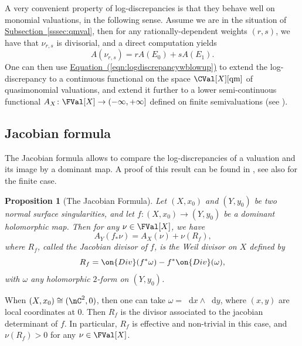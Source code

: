 \documentclass[11 pt, twoside, a4paper]{amsart}
\newcommand{\dd}{\mathop{}\!\mathrm{d}}
\newcommand{\Kld}{{A}}
\newtheorem{prop}[thm]{Proposition}
\theoremstyle{definition}
\theoremstyle{definition}
\newcommand{\JD}[1]{R_{#1}}
\newcommand{\refsssec}[1]{\hyperref[sssec:#1]{Subsection~\ref*{sssec:#1}}}
\newcommand{\refeqn}[1]{\hyperref[eqn:#1]{Equation~(\ref*{eqn:#1})}}
\begin{document}
A very convenient property of log-discrepancies is that they behave well on monomial valuations, in the following sense.
Assume we are in the situation of \refsssec{qmval}, then for any rationally-dependent weights $(r,s)$, we have that $\nu_{r,s}$ is divisorial, and a direct computation yields
\begin{equation}\label{eqn:logdiscrepancywblowup}
\Kld(\nu_{r,s}) = r \Kld(E_0) + s \Kld(E_1)\text{.}
\end{equation}
One can then use \refeqn{logdiscrepancywblowup} to extend the log-discrepancy to a continuous functional on the space $\CVal[X][\mathrm{qm}]$ of quasimonomial valuations, and extend it further to a lower semi-continuous functional $\Kld_X \colon \FVal[X] \to (-\infty,+\infty]$ defined on finite semivaluations (see \cite[Proposition 1.6]{favre:holoselfmapssingratsurf}). 


\subsection{Jacobian formula}\label{ssec:jacobianformula}

The Jacobian formula allows to compare the log-discrepancies of a valuation and its image by a dominant map.
A proof of this result can be found in \cite[Section 4.5]{gignac-ruggiero:locdynnoninvnormsurfsing}, see also \cite[Proposition 1.9]{favre:holoselfmapssingratsurf} for the finite case.

\begin{prop}[The Jacobian Formula]\label{prop:jacobian_formula}
Let $(X,x_0)$ and $(Y,y_0)$ be two normal surface singularities, and let $f\colon(X,x_0) \to (Y,y_0)$ be a dominant holomorphic map.
Then for any $\nu \in \FVal[X]$, we have
\begin{equation}\label{eqn:jacobian_formula}
\Kld_Y(f_*\nu)= \Kld_X(\nu) + \nu(\JD{f})\text{,}
\end{equation}
where $\JD{f}$, called the \emph{Jacobian divisor} of $f$, is the Weil divisor on $X$ defined by
\begin{equation}\label{eqn:jacobian_divisor}
\JD{f} = \on{Div}(f^*\omega) - f^* \on{Div}(\omega)\text{,}
\end{equation}
with $\omega$ any holomorphic $2$-form on $(Y,y_0)$. %
\end{prop}

When $(X,x_0) \cong (\nC^2,0)$, then one can take $\omega = \dd x \wedge \dd y$, where $(x,y)$ are local coordinates at $0$. Then $\JD{f}$ is the divisor associated to the jacobian determinant of $f$. In particular, $\JD{f}$ is effective and non-trivial in this case, and $\nu(\JD{f})>0$ for any $\nu \in \FVal[X]$.
\end{document}

